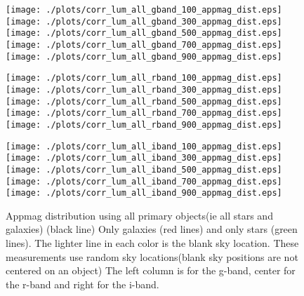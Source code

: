 \documentclass[10pt]{article}
\begin{document}
\begin{figure}
\centering
\begin{minipage}{0.32\textwidth}
 \texttt{[image: ./plots/corr\_lum\_all\_gband\_100\_appmag\_dist.eps]}
 \texttt{[image: ./plots/corr\_lum\_all\_gband\_300\_appmag\_dist.eps]}
 \texttt{[image: ./plots/corr\_lum\_all\_gband\_500\_appmag\_dist.eps]}
 \texttt{[image: ./plots/corr\_lum\_all\_gband\_700\_appmag\_dist.eps]}
 \texttt{[image: ./plots/corr\_lum\_all\_gband\_900\_appmag\_dist.eps]}
\end{minipage}
\begin{minipage}{0.32\textwidth}
 \texttt{[image: ./plots/corr\_lum\_all\_rband\_100\_appmag\_dist.eps]}
 \texttt{[image: ./plots/corr\_lum\_all\_rband\_300\_appmag\_dist.eps]}
 \texttt{[image: ./plots/corr\_lum\_all\_rband\_500\_appmag\_dist.eps]}
 \texttt{[image: ./plots/corr\_lum\_all\_rband\_700\_appmag\_dist.eps]}
 \texttt{[image: ./plots/corr\_lum\_all\_rband\_900\_appmag\_dist.eps]}
\end{minipage}
\begin{minipage}{0.32\textwidth}
 \texttt{[image: ./plots/corr\_lum\_all\_iband\_100\_appmag\_dist.eps]}
 \texttt{[image: ./plots/corr\_lum\_all\_iband\_300\_appmag\_dist.eps]}
 \texttt{[image: ./plots/corr\_lum\_all\_iband\_500\_appmag\_dist.eps]}
 \texttt{[image: ./plots/corr\_lum\_all\_iband\_700\_appmag\_dist.eps]}
 \texttt{[image: ./plots/corr\_lum\_all\_iband\_900\_appmag\_dist.eps]}
\end{minipage}
\caption{Appmag distribution using all primary objects(ie all stars and galaxies) (black line) 
Only galaxies (red lines) and only stars (green lines).
The lighter line in each color is the blank sky location.
These measurements use random sky locations(blank sky positions are not centered on an object)
The left column is for the g-band, center for the r-band and right for the i-band.
}
\end{figure}
\end{document}

